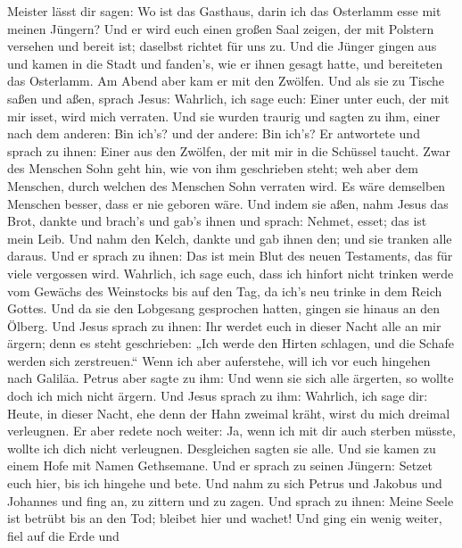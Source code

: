 Meister lässt dir sagen: Wo ist das Gasthaus, darin ich das Osterlamm
esse mit meinen Jüngern?  Und er wird euch einen großen
Saal zeigen, der mit Polstern versehen und bereit ist; daselbst richtet
für uns zu.  Und die Jünger gingen aus und kamen in die
Stadt und fanden's, wie er ihnen gesagt hatte, und bereiteten das
Osterlamm.  Am Abend aber kam er mit den Zwölfen.
 Und als sie zu Tische saßen und aßen, sprach Jesus:
Wahrlich, ich sage euch: Einer unter euch, der mit mir isset, wird mich
verraten.  Und sie wurden traurig und sagten zu ihm, einer
nach dem anderen: Bin ich's? und der andere: Bin ich's?  Er
antwortete und sprach zu ihnen: Einer aus den Zwölfen, der mit mir in
die Schüssel taucht.  Zwar des Menschen Sohn geht hin, wie
von ihm geschrieben steht; weh aber dem Menschen, durch welchen des
Menschen Sohn verraten wird. Es wäre demselben Menschen besser, dass er
nie geboren wäre.  Und indem sie aßen, nahm Jesus das Brot,
dankte und brach's und gab's ihnen und sprach: Nehmet, esset; das ist
mein Leib.  Und nahm den Kelch, dankte und gab ihnen den;
und sie tranken alle daraus.  Und er sprach zu ihnen: Das
ist mein Blut des neuen Testaments, das für viele vergossen wird.
 Wahrlich, ich sage euch, dass ich hinfort nicht trinken
werde vom Gewächs des Weinstocks bis auf den Tag, da ich's neu trinke in
dem Reich Gottes.  Und da sie den Lobgesang gesprochen
hatten, gingen sie hinaus an den Ölberg.  Und Jesus sprach
zu ihnen: Ihr werdet euch in dieser Nacht alle an mir ärgern; denn es
steht geschrieben: „Ich werde den Hirten schlagen, und die Schafe werden
sich zerstreuen.``  Wenn ich aber auferstehe, will ich vor
euch hingehen nach Galiläa.  Petrus aber sagte zu ihm: Und
wenn sie sich alle ärgerten, so wollte doch ich mich nicht ärgern.
 Und Jesus sprach zu ihm: Wahrlich, ich sage dir: Heute, in
dieser Nacht, ehe denn der Hahn zweimal kräht, wirst du mich dreimal
verleugnen.  Er aber redete noch weiter: Ja, wenn ich mit
dir auch sterben müsste, wollte ich dich nicht verleugnen. Desgleichen
sagten sie alle.  Und sie kamen zu einem Hofe mit Namen
Gethsemane. Und er sprach zu seinen Jüngern: Setzet euch hier, bis ich
hingehe und bete.  Und nahm zu sich Petrus und Jakobus und
Johannes und fing an, zu zittern und zu zagen.  Und sprach
zu ihnen: Meine Seele ist betrübt bis an den Tod; bleibet hier und
wachet!  Und ging ein wenig weiter, fiel auf die Erde und
